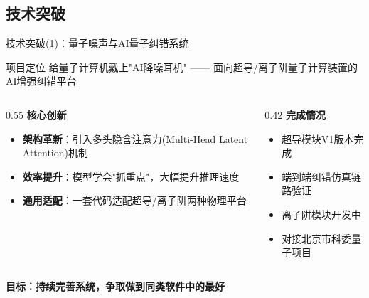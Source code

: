 \documentclass[aspectratio=169,11pt]{beamer}
\begin{document}
\subsection{技术突破}
\begin{frame}{技术突破(1)：量子噪声与AI量子纠错系统}
    \begin{block}{项目定位}
        给量子计算机戴上"AI降噪耳机" —— 面向超导/离子阱量子计算装置的AI增强纠错平台
    \end{block}
    
    \vspace{0.2cm}
    
    \begin{columns}[T]
        \begin{column}{0.55\textwidth}
            \textbf{核心创新}
            \begin{itemize}
                \item \textcolor{cmccgreen}{\textbf{架构革新}}：引入多头隐含注意力(Multi-Head Latent Attention)机制
                \item \textcolor{cmccgreen}{\textbf{效率提升}}：模型学会"抓重点"，大幅提升推理速度
                \item \textcolor{cmccgreen}{\textbf{通用适配}}：一套代码适配超导/离子阱两种物理平台
            \end{itemize}
        \end{column}
        \begin{column}{0.42\textwidth}
            \textbf{完成情况}
            \begin{itemize}
                \item[$\checkmark$] 超导模块V1版本完成
                \item[$\checkmark$] 端到端纠错仿真链路验证
                \item[$\circ$] 离子阱模块开发中
                \item[$\circ$] 对接北京市科委量子项目
            \end{itemize}
        \end{column}
    \end{columns}
    
    \vspace{0.2cm}
    \begin{center}
        \colorbox{highlight!30}{\textbf{目标：持续完善系统，争取做到同类软件中的最好}}
    \end{center}
\end{frame}
\end{document}
